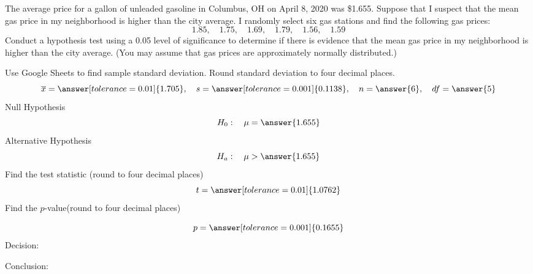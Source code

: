 \documentclass{ximera}
\begin{document}
\begin{problem}\label{prob:140hom8prob6}
The average price for a gallon of unleaded gasoline in Columbus, OH on April 8, 2020 was \$1.655.  Suppose that I suspect that the mean gas price in my neighborhood is higher than the city average.  I randomly select six gas stations and find the following gas prices:
$$1.85,\quad 1.75, \quad 1.69,\quad 1.79,\quad 1.56,\quad 1.59$$
Conduct a hypothesis test using a 0.05 level of significance to determine if there is evidence that the mean gas price in my neighborhood is higher than the city average.  (You may assume that gas prices are approximately normally distributed.)

Use Google Sheets to find sample standard deviation.  Round standard deviation to four decimal places.
$$\overline{x}=\answer[tolerance=0.01]{1.705},\quad s=\answer[tolerance=0.001]{0.1138},\quad n=\answer{6},\quad df=\answer{5}$$
Null Hypothesis
$$H_0:\quad \mu=\answer{1.655}$$
Alternative Hypothesis
$$H_a:\quad \mu>\answer{1.655}$$
Find the test statistic (round to four decimal places)
$$t=\answer[tolerance=0.01]{1.0762}$$
Find the $p$-value(round to four decimal places)
\begin{center}  
\end{center}
$$p=\answer[tolerance=0.001]{0.1655}$$
Decision:

\begin{multipleChoice} 
\end{multipleChoice}  

Conclusion:

\begin{multipleChoice} 
\end{multipleChoice} 
\end{problem}
\end{document}
